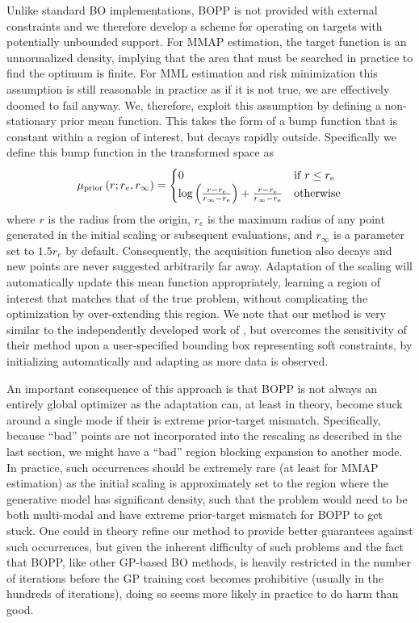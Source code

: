 Unlike standard BO implementations, BOPP is not provided with external constraints and we therefore 
develop a scheme for operating on targets with potentially unbounded support.  For MMAP estimation,
the target function is an unnormalized density, implying that the area that must 
be searched in practice to find the optimum is finite.  For MML estimation and risk minimization this
assumption is still reasonable in practice as if it is not true, we are effectively doomed to fail anyway.
We, therefore, exploit this assumption by defining a non-stationary prior mean function.  
This takes the form of a bump function that is constant within a region of interest, but decays rapidly 
outside.  Specifically we define this bump function in the transformed space as
\begin{align}
\label{eq:BUMP}
\mu_{\mathrm{prior}}\left(r;r_e,r_{\mathrm{\infty}}\right) = \begin{cases} 0  \hfill & \mathrm{if} \; r \leq r_{\mathrm{e}} \\ 
\log \left(\frac{r-r_{\mathrm{e}}}{r_{\mathrm{\infty}}-r_{\mathrm{e}}}\right)+\frac{r-r_{\mathrm{e}}}{r_{\mathrm{\infty}}-r_{\mathrm{e}}} & \mathrm{otherwise} \end{cases}
\end{align}
where $r$ is the radius from the origin, $r_e$ is the maximum radius of any point generated 
in the initial scaling or subsequent evaluations, and $r_{\mathrm{\infty}}$ is a parameter 
set to $1.5 r_{e}$ by default.  Consequently, the acquisition function also decays and new points 
are never suggested arbitrarily far away.  Adaptation of the scaling will automatically update this 
mean function appropriately, learning a region of interest that matches that of the true problem, 
without complicating the optimization by over-extending this region.  We note that our method 
is very similar to the independently developed work of \cite{shahriari2016unbounded}, but overcomes the 
sensitivity of their method upon a user-specified bounding box representing soft constraints, 
by initializing automatically and adapting as more data is observed.

An important consequence of this approach is that BOPP is not always an entirely
global optimizer as the adaptation can, at least in theory, become stuck around a single mode if
their is extreme prior-target mismatch.  Specifically, because ``bad'' points 
are not incorporated into the rescaling as described in the last
section, we might have a ``bad'' region blocking expansion to another mode.
In practice, such occurrences should be extremely rare (at least for MMAP estimation) as the
initial scaling is approximately set to the region where the generative model has significant density, such that
the problem would need to be both multi-modal and have extreme prior-target mismatch for BOPP to
get stuck.  One could in theory refine our method to provide better guarantees against such occurrences,
but given the inherent difficulty of such problems and the fact that BOPP, like other GP-based BO methods,
is heavily restricted in the number of iterations before the GP training cost becomes
prohibitive (usually in the hundreds of iterations), doing so seems more likely in practice to do harm than good.